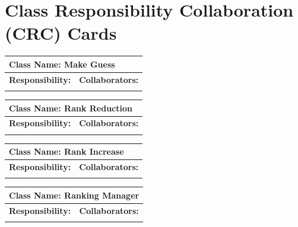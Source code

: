 \documentclass[]{article}
\begin{document}
	
\section{Class Responsibility Collaboration (CRC) Cards}
\label{sec:class_responsibility_collaboration_crc_cards}

	\begin{table}[H]
		\centering
		\begin{tabular}{|p{5cm}|p{5cm}|}
		\hline 
		 \multicolumn{2}{|l|}{\textbf{Class Name:} Make Guess} \\
		\hline
		\textbf{Responsibility:} & \textbf{Collaborators:} \\
		\hline
		\vspace{1in} & \\
		\hline
		\end{tabular}
	\end{table}
	
	\begin{table}[H]
		\centering
		\begin{tabular}{|p{5cm}|p{5cm}|}
		\hline 
		 \multicolumn{2}{|l|}{\textbf{Class Name:} Rank Reduction} \\
		\hline
		\textbf{Responsibility:} & \textbf{Collaborators:} \\
		\hline
		\vspace{1in} & \\
		\hline
		\end{tabular}
	\end{table}

	\begin{table}[H]
		\centering
		\begin{tabular}{|p{5cm}|p{5cm}|}
		\hline 
		 \multicolumn{2}{|l|}{\textbf{Class Name:} Rank Increase} \\
		\hline
		\textbf{Responsibility:} & \textbf{Collaborators:} \\
		\hline
		\vspace{1in} & \\
		\hline
		\end{tabular}
	\end{table}

	\begin{table}[H]
		\centering
		\begin{tabular}{|p{5cm}|p{5cm}|}
		\hline 
		 \multicolumn{2}{|l|}{\textbf{Class Name:} Ranking Manager} \\
		\hline
		\textbf{Responsibility:} & \textbf{Collaborators:} \\
		\hline
		\vspace{1in} & \\
		\hline
		\end{tabular}
	\end{table}
\end{document}
